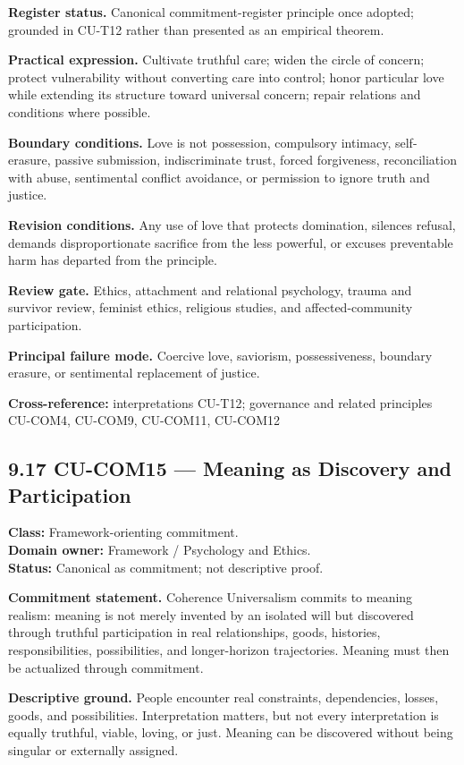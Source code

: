 \documentclass[
  11pt,
]{article}
\begin{document}
\textbf{Register status.} Canonical commitment-register principle once
adopted; grounded in CU-T12 rather than presented as an empirical
theorem.

\textbf{Practical expression.} Cultivate truthful care; widen the circle
of concern; protect vulnerability without converting care into control;
honor particular love while extending its structure toward universal
concern; repair relations and conditions where possible.

\textbf{Boundary conditions.} Love is not possession, compulsory
intimacy, self-erasure, passive submission, indiscriminate trust, forced
forgiveness, reconciliation with abuse, sentimental conflict avoidance,
or permission to ignore truth and justice.

\textbf{Revision conditions.} Any use of love that protects domination,
silences refusal, demands disproportionate sacrifice from the less
powerful, or excuses preventable harm has departed from the principle.

\textbf{Review gate.} Ethics, attachment and relational psychology,
trauma and survivor review, feminist ethics, religious studies, and
affected-community participation.

\textbf{Principal failure mode.} Coercive love, saviorism,
possessiveness, boundary erasure, or sentimental replacement of justice.

\textbf{Cross-reference:} interpretations CU-T12; governance and related
principles CU-COM4, CU-COM9, CU-COM11, CU-COM12

\subsection{9.17 CU-COM15 --- Meaning as Discovery and
Participation}\label{cu-com15-meaning-as-discovery-and-participation}

\textbf{Class:} Framework-orienting commitment.\\
\textbf{Domain owner:} Framework / Psychology and Ethics.\\
\textbf{Status:} Canonical as commitment; not descriptive proof.

\textbf{Commitment statement.} Coherence Universalism commits to meaning
realism: meaning is not merely invented by an isolated will but
discovered through truthful participation in real relationships, goods,
histories, responsibilities, possibilities, and longer-horizon
trajectories. Meaning must then be actualized through commitment.

\textbf{Descriptive ground.} People encounter real constraints,
dependencies, losses, goods, and possibilities. Interpretation matters,
but not every interpretation is equally truthful, viable, loving, or
just. Meaning can be discovered without being singular or externally
assigned.
\end{document}
